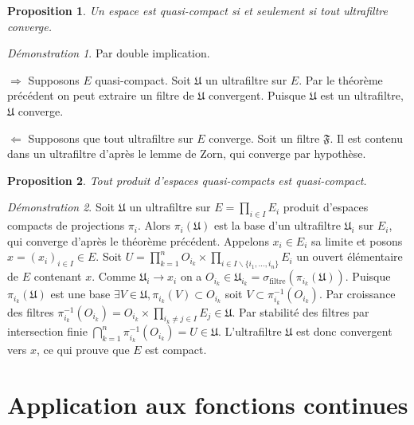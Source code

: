 \documentclass[a4paper, 11pt, french]{book}
\newenvironment{itemise}{\itemize}{\enditemize}
\theoremstyle{plain} %
\newtheorem{proposition}{Proposition}
\theoremstyle{definition} %
\theoremstyle{remark} %
\newtheorem*{demonstration}{Démonstration}
\renewcommand{\setminus}{\backslash}
\newcommand{\1}{\mathds{1}}
\newcommand{\inv}[1]{#1^{-1}}
\begin{document}
\begin{proposition}
	Un espace est quasi-compact si et seulement si tout ultrafiltre converge.
\end{proposition}

\begin{demonstration}
	Par double implication.
	\begin{itemise}
		\item[$\Rightarrow$] Supposons $E$ quasi-compact.
		Soit $\mathfrak{U}$ un ultrafiltre sur $E$.
		Par le théorème précédent on peut extraire un filtre de $\mathfrak{U}$ convergent.
		Puisque $\mathfrak{U}$ est un ultrafiltre, $\mathfrak{U}$ converge.
		\item[$\Leftarrow$] Supposons que tout ultrafiltre sur $E$ converge.
		Soit un filtre $\mathfrak{F}$.
		Il est contenu dans un ultrafiltre d'après le lemme de Zorn, qui converge par hypothèse.
	\end{itemise}
\end{demonstration}

\begin{proposition}
	Tout produit d’espaces quasi-compacts est quasi-compact.
\end{proposition}

\begin{demonstration}
	Soit $\mathfrak{U}$ un ultrafiltre sur $E=\prod_{i\in I}E_i$ produit d'espaces compacts de projections $\pi_i$.
	Alors $\pi_i(\mathfrak{U})$ est la base d'un ultrafiltre $\mathfrak{U}_i$ sur $E_i$, qui converge d'après le théorème précédent.
	Appelons $x_i\in E_i$ sa limite et posons $x=(x_i)_{i\in I}\in E$.
	Soit $U=\prod_{k=1}^nO_{i_k}\times\prod_{i\in I\setminus\{i_1, ..., i_n\}}E_i$ un ouvert élémentaire de $E$ contenant $x$.
	Comme $\mathfrak{U}_i\rightarrow x_i$ on a $O_{i_k}\in\mathfrak{U}_{i_k}=\sigma_\text{filtre}(\pi_{i_k}(\mathfrak{U}))$.
	Puisque $\pi_{i_k}(\mathfrak{U})$ est une base $\exists V\in\mathfrak{U}, \pi_{i_k}(V)\subset O_{i_k}$ soit $V\subset\inv{\pi_{i_k}}(O_{i_k})$.
	Par croissance des filtres $\inv{\pi_{i_k}}(O_{i_k})=O_{i_k}\times\prod_{i_k\neq j\in I}E_j\in\mathfrak{U}$.
	Par stabilité des filtres par intersection finie $\bigcap_{k=1}^n\inv{\pi_{i_k}}(O_{i_k})=U\in\mathfrak{U}$.
	L’ultrafiltre $\mathfrak{U}$ est donc convergent vers $x$, ce qui prouve que $E$ est compact.
\end{demonstration}

\section{Application aux fonctions continues}
\end{document}
